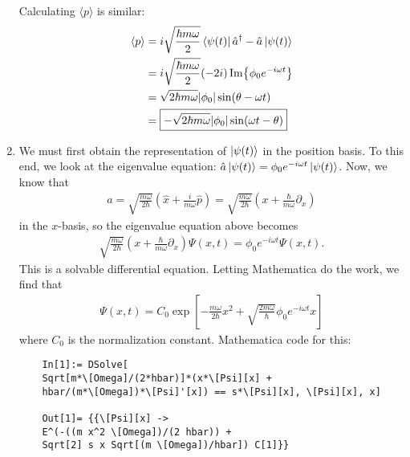 \documentclass{article}
\theoremstyle{definition}
\newcommand{\p}{\partial}
\newcommand{\f}[2]{\frac{#1}{#2}}
\newcommand{\lp}{\left(}
\newcommand{\rp}{\right)}
\newcommand{\lb}{\left[}
\newcommand{\rb}{\right]}
\begin{document}
\begin{enumerate}[label=(\alph*)]
	
	Calculating $\langle p \rangle$ is similar:
	\begin{align*}
	\langle p \rangle 
	&= i\sqrt{\f{\hbar m \omega}{2}} \bra{\psi(t)} \hat a^\dagger - \hat a \ket{\psi(t)}\\
	&=  i\sqrt{\f{\hbar m \omega}{2}}(-2i)\Im{\phi_0 e^{-i\omega t}}\\
	&= \sqrt{2\hbar m \omega} \abs{\phi_0}\sin(\theta - \omega t) \\
	&= \boxed{- \sqrt{2\hbar m \omega} \abs{\phi_0}\sin(\omega t - \theta) }
	\end{align*}
	
	\item We must first obtain the representation of $\ket{\psi(t)}$ in the position basis. To this end, we look at the eigenvalue equation: $\hat a \ket{\psi(t)} = \phi_0 e^{-i\omega t}\ket{\psi(t)}$. Now, we know that 
	\begin{align*}
	\hat a = \sqrt{\f{m\omega}{2\hbar}}\lp \hat x + \f{i}{m\omega} \hat p\rp = \sqrt{\f{m\omega}{2\hbar}}\lp x + \f{\hbar}{m\omega} \p_x \rp 
	\end{align*}  
	in the $x$-basis, so the eigenvalue equation above becomes
	\begin{align*}
	\sqrt{\f{m\omega}{2\hbar}}\lp x + \f{\hbar}{m\omega} \p_x \rp  \Psi(x,t) = \phi_0 e^{-i\omega t} \Psi(x,t).
	\end{align*}
	This is a solvable differential equation. Letting Mathematica do the work, we find that
	\begin{align*}
	\Psi(x,t) = C_0\exp\lb -\f{m\omega}{2\hbar}x^2 + \sqrt{\f{2m\omega}{\hbar}} \phi_0 e^{-i\omega t} x  \rb
	\end{align*}
	where $C_0$ is the normalization constant. Mathematica code for this:
	\begin{lstlisting}
	In[1]:= DSolve[
	Sqrt[m*\[Omega]/(2*hbar)]*(x*\[Psi][x] + 
	hbar/(m*\[Omega])*\[Psi]'[x]) == s*\[Psi][x], \[Psi][x], x]
	
	Out[1]= {{\[Psi][x] -> 
	E^(-((m x^2 \[Omega])/(2 hbar)) + 
	Sqrt[2] s x Sqrt[(m \[Omega])/hbar]) C[1]}}
	\end{lstlisting}
	

\end{enumerate}
\end{document}
